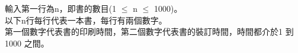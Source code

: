 輸入第一行為n，即書的數目(1 $\leq$ n $\leq$ 1000)。\\
以下n行每行代表一本書，每行有兩個數字。\\
第一個數字代表書的印刷時間，第二個數字代表書的裝訂時間，時間都介於1 到1000 之間。\\
